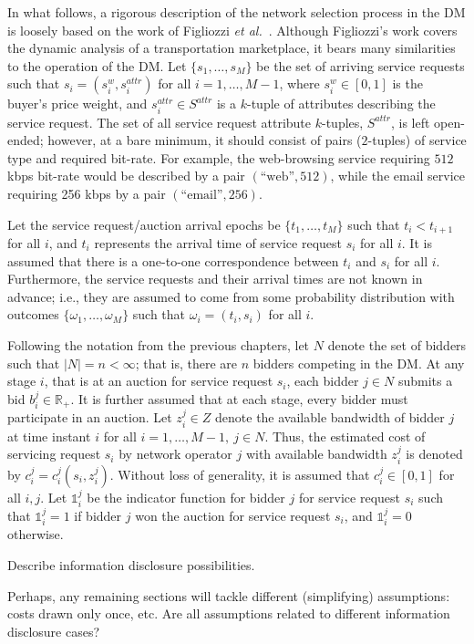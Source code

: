 In what follows, a rigorous description of the network selection process in the DM is loosely based on the work of Figliozzi \emph{et al.}~\cite{FigliozziJaillet2008}. Although Figliozzi's work covers the dynamic analysis of a transportation marketplace, it bears many similarities to the operation of the DM. Let $\{s_1,\ldots,s_M\}$ be the set of arriving service requests such that $s_i = (s^w_i, s^{attr}_i)$ for all $i=1,\ldots,M-1$, where $s^w_i\in [0,1]$ is the buyer's price weight, and $s^{attr}_i\in S^{attr}$ is a $k$-tuple of attributes describing the service request. The set of all service request attribute $k$-tuples, $S^{attr}$, is left open-ended; however, at a bare minimum, it should consist of pairs ($2$-tuples) of service type and required bit-rate. For example, the web-browsing service requiring $512$ kbps bit-rate would be described by a pair $(\text{``web''}, 512)$, while the email service requiring 256 kbps by a pair $(\text{``email''}, 256)$.

Let the service request/auction arrival epochs be $\{t_1,\ldots,t_M\}$ such that $t_i < t_{i+1}$ for all $i$, and $t_i$ represents the arrival time of service request $s_i$ for all $i$. It is assumed that there is a one-to-one correspondence between $t_i$ and $s_i$ for all $i$. Furthermore, the service requests and their arrival times are not known in advance; i.e., they are assumed to come from some probability distribution with outcomes $\{\omega_1,\ldots,\omega_M\}$ such that $\omega_i = (t_i, s_i)$ for all $i$.

Following the notation from the previous chapters, let $N$ denote the set of bidders such that $|N| = n < \infty$; that is, there are $n$ bidders competing in the DM. At any stage $i$, that is at an auction for service request $s_i$, each bidder $j\in N$ submits a bid $b^j_i\in\mathbb{R}_+$. It is further assumed that at each stage, every bidder must participate in an auction. Let $z^j_i\in Z$ denote the available bandwidth of bidder $j$ at time instant $i$ for all $i=1,\ldots,M-1,\: j\in N$. Thus, the estimated cost of servicing request $s_i$ by network operator $j$ with available bandwidth $z^j_i$ is denoted by $c^j_i = c^j_i(s_i,z^j_i)$. Without loss of generality, it is assumed that $c^j_i\in [0,1]$ for all $i,j$. Let $\mathds{1}^j_i$ be the indicator function for bidder $j$ for service request $s_i$ such that $\mathds{1}^j_i=1$ if bidder $j$ won the auction for service request $s_i$, and $\mathds{1}^j_i=0$ otherwise.

Describe information disclosure possibilities.

Perhaps, any remaining sections will tackle different (simplifying) assumptions: costs drawn only once, etc. Are all assumptions related to different information disclosure cases?

